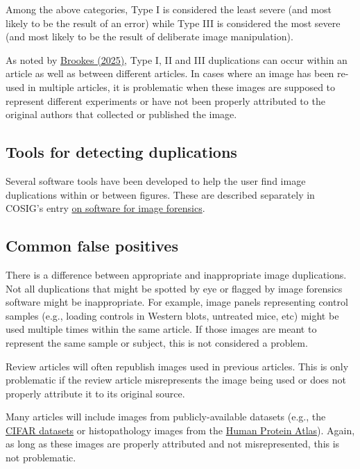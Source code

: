 \documentclass[letterpaper, 12pt]{article}
\begin{document}
Among the above categories, Type I is considered the least severe (and most likely to be the result of an error) while Type III is considered the most severe (and most likely to be the result of deliberate image manipulation).

As noted by \href{https://doi.org/10.1017/jme.2025.32}{Brookes (2025)}, Type I, II and III duplications can occur within an article as well as between different articles. In cases where an image has been re-used in multiple articles, it is problematic when these images are supposed to represent different experiments or have not been properly attributed to the original authors that collected or published the image.

\subsection*{Tools for detecting duplications}

Several software tools have been developed to help the user find image duplications within or between figures. These are described separately in COSIG's entry \href{https://osf.io/g23pf}{on software for image forensics}.

\subsection*{Common false positives}

There is a difference between appropriate and inappropriate image duplications. Not all duplications that might be spotted by eye or flagged by image forensics software might be inappropriate. For example, image panels representing control samples (e.g., loading controls in Western blots, untreated mice, etc) might be used multiple times within the same article. If those images are meant to represent the same sample or subject, this is not considered a problem.

Review articles will often republish images used in previous articles. This is only problematic if the review article misrepresents the image being used or does not properly attribute it to its original source.

Many articles will include images from publicly-available datasets (e.g., the \href{https://www.cs.toronto.edu/~kriz/cifar.html}{CIFAR datasets} or histopathology images from the \href{https://www.proteinatlas.org/}{Human Protein Atlas}). Again, as long as these images are properly attributed and not misrepresented, this is not problematic.
\end{document}
